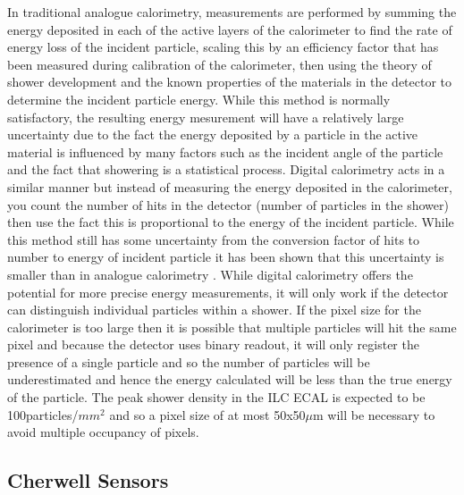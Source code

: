 In traditional analogue calorimetry, measurements are performed by summing the energy deposited in each of the active layers of the calorimeter to find the rate of energy loss of the incident particle, scaling this by an efficiency factor that has been measured during calibration of the calorimeter, then using the theory of shower development and the known properties of the materials in the detector to determine the incident particle energy. While this method is normally satisfactory, the resulting energy mesurement will have a relatively large uncertainty due to the fact the energy deposited by a particle in the active material is influenced by many factors such as the incident angle of the particle and the fact that showering is a statistical process. Digital calorimetry acts in a similar manner but instead of measuring the energy deposited in the calorimeter, you count the number of hits in the detector (number of particles in the shower) then use the fact this is proportional to the energy of the incident particle. While this method still has some uncertainty from the conversion factor of hits to number to energy of incident particle it has been shown that this uncertainty is smaller than in analogue calorimetry \cite{Price:2012vta}. While digital calorimetry offers the potential for more precise energy measurements, it will only work if the detector can distinguish individual particles within a shower. If the pixel size for the calorimeter is too large then it is possible that multiple particles will hit the same pixel and because the detector uses binary readout, it will only register the presence of a single particle and so the number of particles will be underestimated and hence the energy calculated will be less than the true energy of the particle. The peak shower density in the ILC ECAL is expected to be 100particles/${mm^2}$ and so a pixel size of at most 50x50${\mu}$m will be necessary to avoid multiple occupancy of pixels.

\subsection{Cherwell Sensors}

